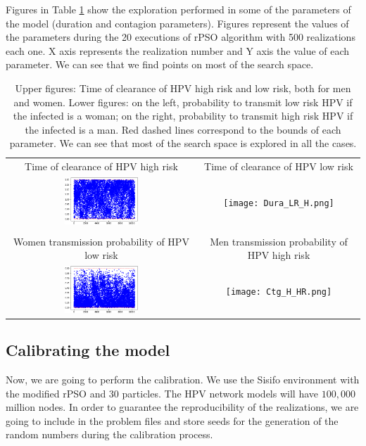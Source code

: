 Figures in Table \ref{Ctg} show the exploration performed in some of the parameters of the model (duration and contagion parameters). Figures represent the values of the parameters during the 20 executions of rPSO algorithm with 500 realizations each one. X axis represents the realization number and Y axis the value of each parameter. We can see that we find points on most of the search space.

\begin{table}[!h]
\begin{center}	
\begin{tabular}{cc}
	Time of clearance of HPV high risk & Time of clearance of HPV low risk \\
	\includegraphics[width=0.4\textwidth]{IMGs/1.-Calibrado/Dura_HR_H.png} & \texttt{[image: Dura\_LR\_H.png]} \\ 
	\\
	Women transmission probability of HPV low risk & Men transmission probability of HPV high risk \\
	\includegraphics[width=0.4\textwidth]{IMGs/1.-Calibrado/Ctg_M_LR.png} & \texttt{[image: Ctg\_H\_HR.png]}  
\end{tabular}
\caption{Upper figures: Time of clearance of HPV high risk and low risk, both for men and women. Lower figures: on the left, probability to transmit low risk HPV if the infected is a woman; on the right, probability to transmit high risk HPV if the infected is a man. Red dashed lines correspond to the bounds of each parameter. We can see that most of the search space is explored in all the cases.} 
\label{Ctg}
\end{center}
\end{table}

\subsection{Calibrating the model}
Now, we are going to perform the calibration. We use the Sisifo environment with the modified rPSO and 30 particles. The HPV network models will have $100,000$ million nodes. In order to guarantee the reproducibility of the realizations, we are going to include in the problem files and store seeds for the generation of the random numbers during the calibration process.

